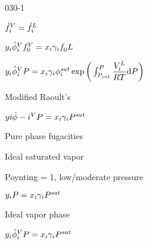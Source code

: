 \begin{mitframe}{030-1}


	\begin{listone}

		\item $\hat{\fug}_{\state}^{\vol}=\hat{\fug}_{\state}^{\length}$
        
        
        \item$y_{\state}\hat{\eleccoeff}_{\state}^{\vol}\fug_{0}^{\vol}=\specfrac{i}\actcoeff\fug_{0}^{}\length$
        
        \item $y_{\state}\hat{\eleccoeff}_{\state}^{\vol}\p=\specfrac{i}\actcoeff\eleccoeff_{\state}^{sat}\exp\bigg(\int\nolimits_{\p_{sat}}^{\p}\dfrac{\vol_{\state}^{\length}}{\gasconst\Temp}\mathrm{d}\p\bigg)$
        \item Modified Raoult's
        
        \begin{listtwo}

			\item $y{\state}\hat{\eleccoeff}-{\state}^{\vol}\p=\specfrac{i}\actcoeff\p^{sat}$
            
            \begin{listthree}
            
           		\item Pure phase fugacities
            
            	\item Ideal saturated vapor
            
           		\item Poynting = 1, low/moderate pressure
            
            	\item $y_{\state}\p=\specfrac{i}\actcoeff\p^{sat}$
                
            
            	\begin{listfour}
                
                	\item Ideal vapor phase

				\end{listfour}
                
                  \item $y_{\state}\hat{\eleccoeff}_{\state}^{\vol}\p=\specfrac{i}\actcoeff\p^{sat}$
                  

\end{listthree}
\end{listtwo}
\end{listone}
\end{mitframe}

